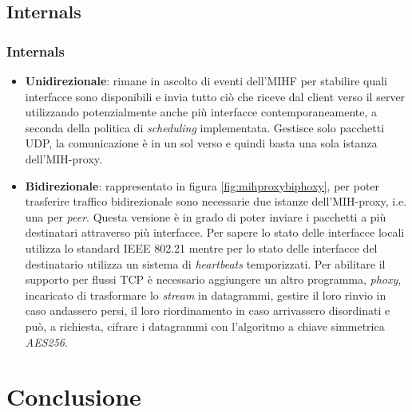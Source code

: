 \documentclass[10pt]{beamer}
\begin{document}
\subsection{Internals}
\begin{frame} %
\frametitle{Internals}
\begin{itemize}
\item \textbf{Unidirezionale}: rimane in ascolto di eventi dell'MIHF per stabilire quali interfacce sono disponibili e invia tutto ciò che riceve dal client verso il server utilizzando potenzialmente anche più interfacce contemporaneamente, a seconda della politica di {\em scheduling} implementata. Gestisce solo pacchetti UDP, la comunicazione è in un sol verso e quindi basta una sola istanza dell'MIH-proxy.
\item \textbf{Bidirezionale}: rappresentato in figura \ref{fig:mihproxybiphoxy}, per poter trasferire traffico bidirezionale sono necessarie due istanze dell'MIH-proxy, i.e. una per {\em peer}. Questa versione è in grado di poter inviare i pacchetti a più destinatari attraverso più interfacce. Per sapere lo stato delle interfacce locali utilizza lo standard IEEE 802.21 mentre per lo stato delle interfacce del destinatario utilizza un sistema di {\em heartbeats} temporizzati. Per abilitare il supporto per flussi TCP è necessario aggiungere un altro programma, {\em phoxy}, incaricato di trasformare lo {\em stream} in datagrammi, gestire il loro rinvio in caso andassero persi, il loro riordinamento in caso arrivassero disordinati e può, a richiesta, cifrare i datagrammi con l'algoritmo a chiave simmetrica {\em AES256}.
\end{itemize}
\end{frame}

\section{Conclusione}
\end{document}
